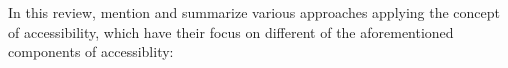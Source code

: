 
In this review, \citet{Geurs2004AccessibilityReview} mention and summarize various approaches applying the concept 
of accessibility, which have their focus on different of the aforementioned components of accessiblity:

